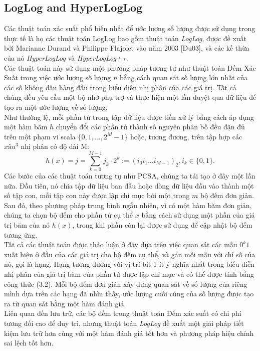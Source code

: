 \documentclass[a4paper,13pt]{article}
\theoremstyle{mytheor}
\begin{document}
\subsection{LogLog and HyperLogLog}
Các thuật toán xác suất phổ biến nhất để ước lượng số lượng được sử dụng trong thực tế là họ các thuật toán LogLog bao gồm thuật toán \textit{LogLog}, 
được đề xuất bởi Marianne Durand và Philippe Flajolet vào năm 2003 [Du03], và các kế thừa của nó \textit{HyperLogLog} và \textit{HyperLogLog++}.\\
Các thuật toán này sử dụng một phương pháp tương tự như thuật toán Đếm Xác Suất trong việc ước lượng số lượng $n$ bằng cách quan sát số lượng lớn nhất 
của các số không dấu hàng đầu trong biểu diễn nhị phân của các giá trị. Tất cả chúng đều yêu cầu một bộ nhớ phụ trợ và thực hiện một lần duyệt qua dữ liệu 
để tạo ra một ước lượng về số lượng.\\
Như thường lệ, mỗi phần tử trong tập dữ liệu được tiền xử lý bằng cách áp dụng một hàm băm $h$ chuyển đổi các phần tử thành số nguyên phân bố đều đặn đủ 
trên một phạm vi scala $\{0,1,...,2^M-1\}$ hoặc, tương đương, trên tập hợp các $xâu^3$ nhị phân có độ dài M:
\[
    h(x) = j = \sum\limits_{k=0}^{M-1}j_k\cdot2^k := \left(i_0i_1...i_{M-1}\right)_2,i_k \in \{0,1\}.    
\]
\indent Các bước của các thuật toán tương tự như PCSA, chúng ta tái tạo ở đây một lần nữa. Đầu tiên, nó chia tập dữ liệu ban đầu hoặc dòng dữ liệu đầu vào 
thành một số tập con, mỗi tập con này được lập chỉ mục bởi một trong $m$ bộ đếm đơn giản. Sau đó, theo phương pháp trung bình ngẫu nhiên, vì có một 
hàm băm đơn giản, chúng ta chọn bộ đếm cho phần tử cụ thể $x$ bằng cách sử dụng một phần của giá trị băm của nó $h(x)$, trong khi phần còn lại được 
sử dụng để cập nhật bộ đếm tương ứng.\\
Tất cả các thuật toán được thảo luận ở đây dựa trên việc quan sát các mẫu $0^k1$ xuất hiện ở đầu của các giá trị cho bộ đếm cụ thể, và gán mỗi mẫu 
với chỉ số của nó, gọi là hạng. Hạng tương đương với vị trí bit 1 ít ý nghĩa nhất trong biểu diễn nhị phân của giá trị băm của phần tử được lập chỉ mục 
và có thể được tính bằng công thức (3.2). Mỗi bộ đếm đơn giản xây dựng quan sát về số lượng của riêng mình dựa trên các hạng đã nhìn thấy, ước lượng 
cuối cùng của số lượng được tạo ra từ quan sát bằng một hàm đánh giá.\\
Liên quan đến lưu trữ, các bộ đếm trong thuật toán Đếm xác suất có chi phí tương đối cao để duy trì, nhưng thuật toán \textit{LogLog} đề xuất một giải pháp 
tiết kiệm lưu trữ hơn cùng với một hàm đánh giá tốt hơn và phương pháp hiệu chỉnh sai lệch tốt hơn.
\end{document}
